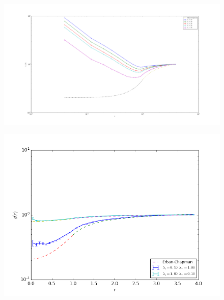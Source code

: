 \documentclass[
  a4paper,BCOR10mm,oneside,
  bibtotoc,idxtotoc,
  headsepline,footsepline,%
  fleqn,openbib
]{scrbook}
\begin{document}
\begin{figure}[h!]
  \centering
  \includegraphics[width=\textwidth]{./data/microrate_complex_radial_erban.png}
  \captionsetup{width=\linewidth}
  \label{fig:microrate_complex_radial_erban}
\end{figure}
\newpage

\begin{figure}[h!]
  \centering
  \includegraphics[width=\textwidth]{./data/microrate_complex_vsmicrorate_forward_radial_erban.png}
  \captionsetup{width=\linewidth}
  \label{fig:microrate_complex_vsmicrorate_forward_radial_erban}
\end{figure}
\newpage
\end{document}
